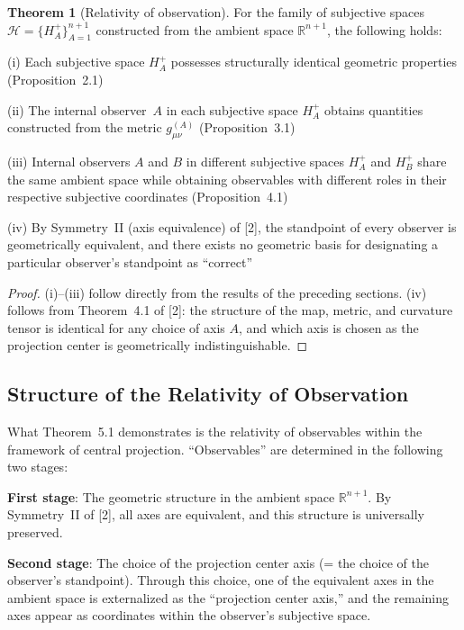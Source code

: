\documentclass[a4paper,11pt]{article}
\theoremstyle{definition}
\newtheorem{theorem}{Theorem}[section]
\begin{document}
\begin{theorem}[Relativity of observation]
For the family of subjective spaces \(\mathcal{H} = \{H_A^+\}_{A=1}^{n+1}\) constructed from the ambient space \(\mathbb{R}^{n+1}\), the following holds:

\textup{(i)} Each subjective space \(H_A^+\) possesses structurally identical geometric properties (Proposition~2.1)

\textup{(ii)} The internal observer~\(A\) in each subjective space \(H_A^+\) obtains quantities constructed from the metric \(g_{\mu\nu}^{(A)}\) (Proposition~3.1)

\textup{(iii)} Internal observers \(A\) and \(B\) in different subjective spaces \(H_A^+\) and \(H_B^+\) share the same ambient space while obtaining observables with different roles in their respective subjective coordinates (Proposition~4.1)

\textup{(iv)} By Symmetry~II (axis equivalence) of {[2]}, the standpoint of every observer is geometrically equivalent, and there exists no geometric basis for designating a particular observer's standpoint as ``correct''
\end{theorem}

\begin{proof}
(i)--(iii) follow directly from the results of the preceding sections. (iv) follows from Theorem~4.1 of {[2]}: the structure of the map, metric, and curvature tensor is identical for any choice of axis \(A\), and which axis is chosen as the projection center is geometrically indistinguishable.
\end{proof}

\subsection{Structure of the Relativity of Observation}

What Theorem~5.1 demonstrates is the relativity of observables within the framework of central projection. ``Observables'' are determined in the following two stages:

\textbf{First stage}: The geometric structure in the ambient space \(\mathbb{R}^{n+1}\). By Symmetry~II of {[2]}, all axes are equivalent, and this structure is universally preserved.

\textbf{Second stage}: The choice of the projection center axis (= the choice of the observer's standpoint). Through this choice, one of the equivalent axes in the ambient space is externalized as the ``projection center axis,'' and the remaining axes appear as coordinates within the observer's subjective space.
\end{document}
